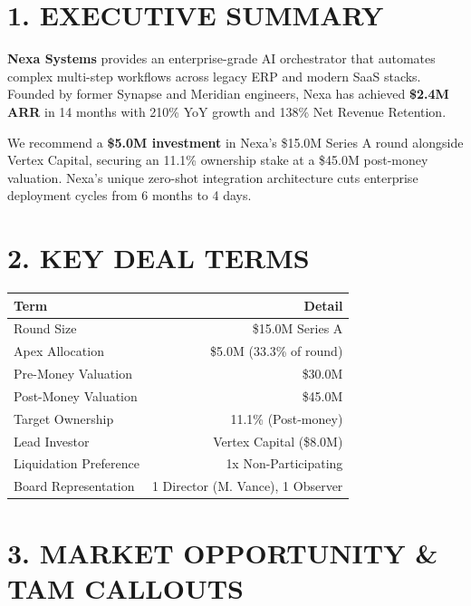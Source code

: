 \documentclass[10pt,a4paper]{article}
\begin{document}
\begin{minipage}[t]{0.48\textwidth}
  \section*{1. EXECUTIVE SUMMARY}
  \textbf{Nexa Systems} provides an enterprise-grade AI orchestrator that automates complex multi-step workflows across legacy ERP and modern SaaS stacks. Founded by former Synapse and Meridian engineers, Nexa has achieved \textbf{\$2.4M ARR} in 14 months with 210\% YoY growth and 138\% Net Revenue Retention.

  We recommend a \textbf{\$5.0M investment} in Nexa's \$15.0M Series A round alongside Vertex Capital, securing an 11.1\% ownership stake at a \$45.0M post-money valuation. Nexa's unique zero-shot integration architecture cuts enterprise deployment cycles from 6 months to 4 days.
\end{minipage}%
\hfill
\begin{minipage}[t]{0.49\textwidth}
  \section*{2. KEY DEAL TERMS}
  \small
  \begin{tabularx}{\textwidth}{@{} X r @{}}
    \toprule
    \textbf{Term} & \textbf{Detail} \\
    \midrule
    Round Size & \$15.0M Series A \\{}
    Apex Allocation & \$5.0M (33.3\% of round) \\{}
    Pre-Money Valuation & \$30.0M \\{}
    Post-Money Valuation & \$45.0M \\{}
    Target Ownership & 11.1\% (Post-money) \\{}
    Lead Investor & Vertex Capital (\$8.0M) \\{}
    Liquidation Preference & 1x Non-Participating \\{}
    Board Representation & 1 Director (M. Vance), 1 Observer \\
    \bottomrule
  \end{tabularx}
\end{minipage}

\vspace{4pt}

\section*{3. MARKET OPPORTUNITY \& TAM CALLOUTS}
\end{document}
